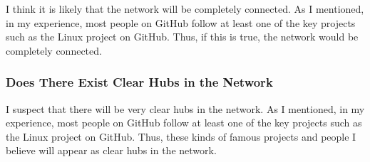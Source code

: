 \documentclass[9pt,twocolumn,twoside]{pnas-new}
\begin{document}
I think it is likely that the network will be completely connected. As I mentioned, in my experience, most people on GitHub follow at least one of the key projects such as the Linux project on GitHub. Thus, if this is true, the network would be completely connected.

\subsubsection{Does There Exist Clear Hubs in the Network}

I suspect that there will be very clear hubs in the network. As I mentioned, in my experience, most people on GitHub follow at least one of the key projects such as the Linux project on GitHub. Thus, these kinds of famous projects and people I believe will appear as clear hubs in the network.

%
\end{document}
